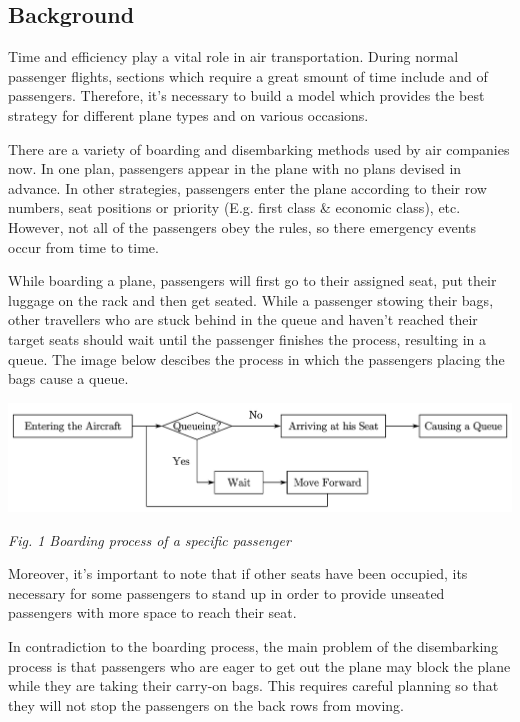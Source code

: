 \documentclass{article}
\begin{document}
	\subsection{Background}
	Time and efficiency play a vital role in air transportation. During normal passenger flights, sections which require a great smount of time include  and  of passengers. Therefore, it's necessary to build a model which provides the best strategy for different plane types and on various occasions.

	There are a variety of boarding and disembarking methods used by air companies now. In one plan, passengers appear in the plane with no plans devised in advance. In other strategies, passengers enter the plane according to their row numbers, seat positions or priority (E.g. first class \& economic class), etc. However, not all of the passengers obey the rules, so there emergency events occur from time to time.

	While boarding a plane, passengers will first go to their assigned seat, put their luggage on the rack and then get seated. While a passenger stowing their bags, other travellers who are stuck behind in the queue and haven't reached their target seats should wait until the passenger finishes the process, resulting in a queue. The image below descibes the process in which the passengers placing the bags cause a queue.

	\begin{center}
		\includegraphics[width=14cm]{chart.jpg}

		\textit{Fig. 1 Boarding process of a specific passenger}
	\end{center}

	Moreover, it's important to note that if other seats have been occupied, its necessary for some passengers to stand up in order to provide unseated passengers with more space to reach their seat.

	In contradiction to the boarding process, the main problem of the disembarking process is that passengers who are eager to get out the plane may block the plane while they are taking their carry-on bags. This requires careful planning so that they will not stop the passengers on the back rows from moving.
\end{document}

